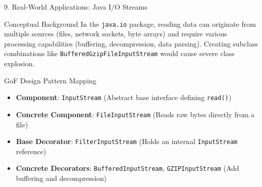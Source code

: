 \documentclass[aspectratio=169]{beamer}
\begin{document}
\begin{frame}{9. Real-World Applications: Java I/O Streams}

\begin{block}{Conceptual Background}
In the \texttt{java.io} package, reading data can originate from multiple sources (files, network sockets, byte arrays) and require various processing capabilities (buffering, decompression, data parsing). Creating subclass combinations like \texttt{BufferedGzipFileInputStream} would cause severe class explosion.
\end{block}

\pause

\begin{block}{GoF Design Pattern Mapping}
\begin{itemize}
    \item \textbf{Component}: \texttt{InputStream} (Abstract base interface defining \texttt{read()})
    \item \textbf{Concrete Component}: \texttt{FileInputStream} (Reads raw bytes directly from a file)
    \item \textbf{Base Decorator}: \texttt{FilterInputStream} (Holds an internal \texttt{InputStream} reference)
    \item \textbf{Concrete Decorators}: \texttt{BufferedInputStream}, \texttt{GZIPInputStream} (Add buffering and decompression)
\end{itemize}
\end{block}

\end{frame}

\end{document}
